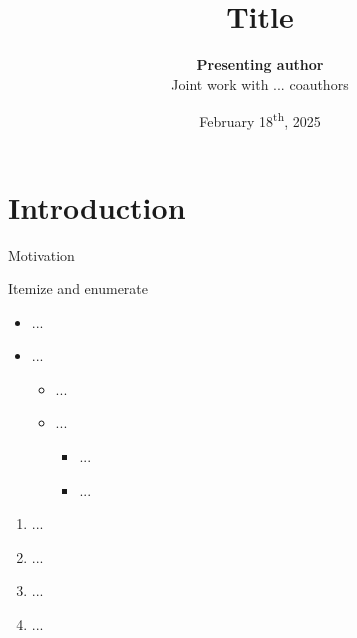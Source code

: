 \documentclass[aspectratio=169]{beamer}  %
\begin{document}
\title[Title short]{Title}  %
\author[Presenting author short]{\textbf{Presenting author}\\Joint work with ... coauthors}  %


\date{February 18\textsuperscript{th}, 2025}

\begin{frame}
  \maketitle
\end{frame}

\section{Introduction}


\begin{frame}{Motivation}
\citet{barth2023let}
\end{frame}


\begin{frame}{Itemize and enumerate}
\begin{itemize}
    \item ...
    \item ...
    \begin{itemize}
        \item ...
        \item ...
        \begin{itemize}
            \item ...
            \item ...
        \end{itemize}
    \end{itemize}
\end{itemize}
\begin{enumerate}
    \item ...
    \item ...
    \item ...
    \item ...
\end{enumerate}
\end{frame}
\end{document}
